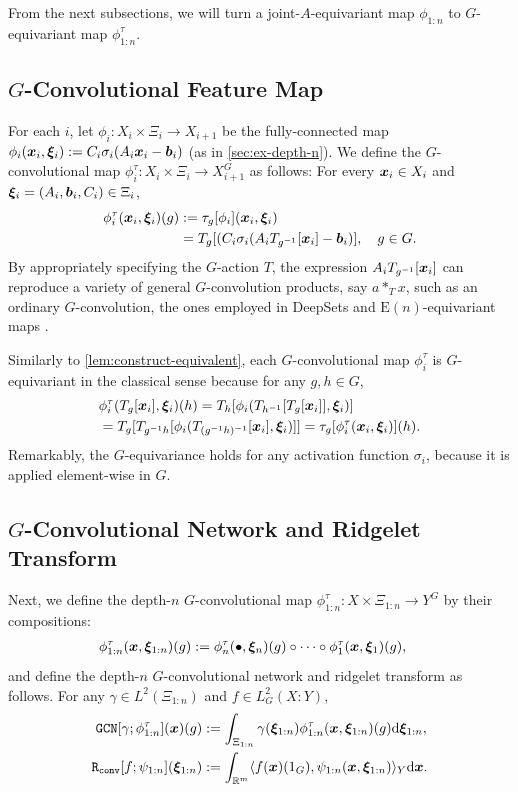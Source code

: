 From the next subsections, we will turn a joint-$A$-equivariant map $\phi_{1:n}$ to $G$-equivariant map $\phi^\tau_{1:n}$.
\subsection{$G$-Convolutional Feature Map}
For each $i$, let $\phi_i : X_i \times \Xi_i \to X_{i+1}$ be the 
fully-connected map $\phi_i(\bm{x}_i,\bm{\xi}_i) := C_i \sigma_i( A_i \bm{x}_i - \bm{b}_i )$ (as in \cref{sec:ex-depth-n}). We define the $G$-convolutional map $\phi^\tau_i : X_i \times \Xi_i \to X_{i+1}^G$ as follows: For every $\bm{x}_i \in X_i$ and $\bm{\xi}_i = (A_i, \bm{b}_i, C_i) \in \Xi_i$,
\begin{align*}
    \phi^\tau_i( \xx_i, \xxi_i )(g)
    &:= \tau_g[\phi_i](\xx_i,\xxi_i) \\
    &= T_g[(C_i \sigma_i( A_i T_{g^{-1}}[\xx_i] - \bb_i )], \quad g \in G. %
\end{align*}
By appropriately specifying the $G$-action $T$, the expression $A_i T_{g^{-1}}[\bm{x}_i]$ can reproduce a variety of general $G$-convolution products, say $a *_T x$, such as an ordinary $G$-convolution, the ones employed in DeepSets and $\mathrm{E}(n)$-equivariant maps \citep[see Section~5 of][]{Sonoda2022gconv}.

Similarly to \cref{lem:construct-equivalent}, each $G$-convolutional map $\phi^\tau_i$ is $G$-equivariant in the classical sense
because for any $g,h \in G$,
\begin{align*}
&\phi^\tau_i( T_g[\bm{x}_i], \bm{\xi}_i )(h)
= T_h[\phi_i( T_{h^{-1}}[T_g[\bm{x}_i]], \bm{\xi}_i )] \notag \\
&= T_g[T_{g^{-1}h}[\phi_i( T_{(g^{-1}h)^{-1}}[\bm{x}_i], \bm{\xi}_i )]] 
= \tau_g[\phi^\tau_i( \bm{x}_i, \bm{\xi}_i )](h).
\end{align*}
Remarkably, the $G$-equivariance holds for any activation function $\sigma_i$, because it is applied element-wise in $G$.

\subsection{$G$-Convolutional Network and Ridgelet Transform}
Next, we define the depth-$n$ $G$-convolutional map $\phi^\tau_{1:n} : X \times \Xi_{1:n} \to Y^G$ by their compositions:
\begin{align*}
    \phi^\tau_{1:n}(\bm{x}, \bm{\xi}_{1:n})(g)
    &:= \phi^\tau_n(\bullet, \bm{\xi}_n)(g) \circ \cdots \circ \phi^\tau_1(\bm{x}, \bm{\xi}_1)(g),
\end{align*}
and define the depth-$n$ $G$-convolutional network and ridgelet transform 
as follows. For any $\gamma \in L^2(\Xi_{1:n})$ and $f \in L^2_G(X:Y)$, %
\begin{align*}
    \mathtt{GCN}[\gamma;\phi^\tau_{1:n}](\bm{x})(g) &:= \int_{\Xi_{1:n}} \gamma(\bm{\xi}_{1:n}) \phi^\tau_{1:n}(\bm{x},\bm{\xi}_{1:n})(g)\mathrm{d}\bm{\xi}_{1:n},\\
    \mathtt{R_{conv}}[f;\psi_{1:n}](\bm{\xi}_{1:n})
    &:= \int_{\mathbb{R}^m} \langle f(\bm{x})(1_G), \psi_{1:n}(\bm{x},\bm{\xi}_{1:n})\rangle_Y\mathrm{d}\bm{x}.
\end{align*}

